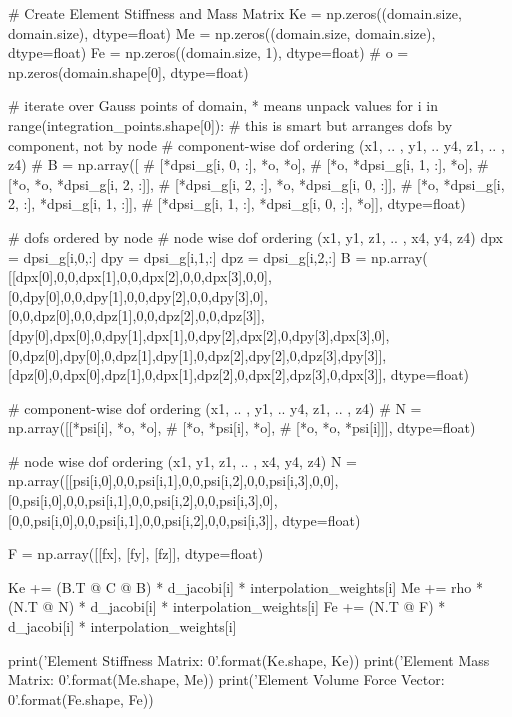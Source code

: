 \documentclass[10pt,b5paper,titlepage]{book}
\begin{document}
\begin{python}
    # Create Element Stiffness and Mass Matrix
    Ke = np.zeros((domain.size, domain.size), dtype=float)
    Me = np.zeros((domain.size, domain.size), dtype=float)
    Fe = np.zeros((domain.size, 1), dtype=float)
    # o = np.zeros(domain.shape[0], dtype=float)

    # iterate over Gauss points of domain, * means unpack values
    for i in range(integration_points.shape[0]):
        # this is smart but arranges dofs by component, not by node
        # component-wise dof ordering (x1, .. , y1, .. y4, z1, .. , z4)
        # B = np.array([
        #   [*dpsi_g[i, 0, :], *o, *o],
        #   [*o, *dpsi_g[i, 1, :], *o],
        #   [*o, *o, *dpsi_g[i, 2, :]],
        #   [*dpsi_g[i, 2, :], *o, *dpsi_g[i, 0, :]],
        #   [*o, *dpsi_g[i, 2, :], *dpsi_g[i, 1, :]],
        #   [*dpsi_g[i, 1, :], *dpsi_g[i, 0, :], *o]], dtype=float)

        # dofs ordered by node
        # node wise dof ordering (x1, y1, z1, .. , x4, y4, z4)
        dpx = dpsi_g[i,0,:]
        dpy = dpsi_g[i,1,:]
        dpz = dpsi_g[i,2,:]
        B = np.array(
            [[dpx[0],0,0,dpx[1],0,0,dpx[2],0,0,dpx[3],0,0],
             [0,dpy[0],0,0,dpy[1],0,0,dpy[2],0,0,dpy[3],0],
             [0,0,dpz[0],0,0,dpz[1],0,0,dpz[2],0,0,dpz[3]],
             [dpy[0],dpx[0],0,dpy[1],dpx[1],0,dpy[2],dpx[2],0,dpy[3],dpx[3],0],
             [0,dpz[0],dpy[0],0,dpz[1],dpy[1],0,dpz[2],dpy[2],0,dpz[3],dpy[3]],
             [dpz[0],0,dpx[0],dpz[1],0,dpx[1],dpz[2],0,dpx[2],dpz[3],0,dpx[3]],
             dtype=float)

        # component-wise dof ordering (x1, .. , y1, .. y4, z1, .. , z4)
        # N = np.array([[*psi[i], *o, *o],
        #               [*o, *psi[i], *o],
        #               [*o, *o, *psi[i]]], dtype=float)

        # node wise dof ordering (x1, y1, z1, .. , x4, y4, z4)
        N = np.array([[psi[i,0],0,0,psi[i,1],0,0,psi[i,2],0,0,psi[i,3],0,0],
                      [0,psi[i,0],0,0,psi[i,1],0,0,psi[i,2],0,0,psi[i,3],0],
                      [0,0,psi[i,0],0,0,psi[i,1],0,0,psi[i,2],0,0,psi[i,3]],
                      dtype=float)

        F = np.array([[fx], [fy], [fz]], dtype=float)

        Ke += (B.T @ C @ B) * d_jacobi[i] * interpolation_weights[i]
        Me += rho * (N.T @ N) * d_jacobi[i] * interpolation_weights[i]
        Fe += (N.T @ F) * d_jacobi[i] * interpolation_weights[i]

    print('Element Stiffness Matrix: {0}'.format(Ke.shape, Ke))
    print('Element Mass Matrix: {0}'.format(Me.shape, Me))
    print('Element Volume Force Vector: {0}'.format(Fe.shape, Fe))
\end{python}
\end{document}
